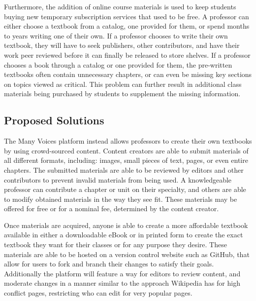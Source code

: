 \documentclass[letterpaper, 10pt, draftclsnofoot, onecolumn]{IEEEtran}
\begin{document}
\medskip

{\noindent Furthermore, the addition of online course materials is used 
to keep students buying new temporary subscription services that used to 
be free. 
A professor can either choose a textbook from a catalog, one provided 
for them, or spend months to years writing one of their own. 
If a professor chooses to write their own textbook, 
they will have to seek publishers, other contributors, and have 
their work peer reviewed before it can finally be released to store 
shelves. 
If a professor chooses a book through a catalog or one provided for 
them, the pre-written textbooks often contain unnecessary chapters, 
or can even be missing key sections on topics viewed as critical. 
This problem can further result in additional class materials being 
purchased by students to supplement the missing information. \par}

\subsection{Proposed Solutions}
\vspace{1pc}

{\noindent The Many Voices platform instead allows professors to create 
their own textbooks by using crowd-sourced content. 
Content creators are able to submit materials of all different formats, 
including: images, small pieces of text, pages, or even entire chapters. 
The submitted materials are able to be reviewed by editors and 
other contributors to prevent invalid materials from being used.
A knowledgeable professor can contribute a chapter or unit on 
their specialty, and others are able to modify obtained materials 
in the way they see fit. These materials may be offered for free 
or for a nominal fee, determined by the content creator. \par}

\medskip

{\noindent Once materials are acquired, anyone is able to create a more 
affordable textbook available in either a downloadable eBook or in 
printed form to create the exact textbook they want for their classes or 
for any purpose they desire. 
These materials are able to be hosted on a version control website such 
as GitHub, that allow for users to fork and branch their changes to 
satisfy their goals.
Additionally the platform will feature a way for editors to review 
content, and moderate changes in a manner similar to the approach 
Wikipedia has for high conflict pages, restricting who can edit for very 
popular pages. \par}
\end{document}

